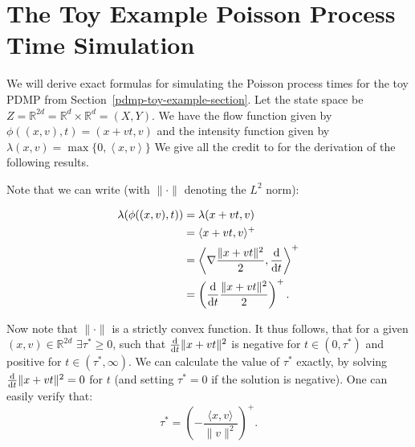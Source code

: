 \documentclass[report.tex]{subfiles}
\begin{document}
\chapter{The Toy Example Poisson Process Time Simulation}
\label{appendix-toy-example-poisson-process-jump-time-simulation}

We will derive exact formulas for simulating the Poisson process times
for the toy PDMP from Section~\ref{pdmp-toy-example-section}.
Let the state space be
$Z = \mathbb{R}^{2d} = \mathbb{R}^{d} \times \mathbb{R}^{d} = (X, Y)$.
We have the flow function given by $\phi((x,v), t) = (x + vt, v)$ and the
intensity function given by $\lambda(x, v) = \max\{0, \left\langle x, v \right\rangle\}$
We give all the credit to \citet{bouchard2015bouncy} for the derivation
of the following results.

Note that we can write (with $\lVert \cdot \rVert$ denoting the $L^{2}$ norm):

\begin{align*}
  \lambda(\phi((x, v), t))
  &= \lambda(x + vt, v) \\
  &= \langle x + vt, v \rangle^{+} \\
  &= \left\langle \nabla \frac{\lVert x + vt \rVert^{2}}{2}, \dv{}{t} (x + vt) \right\rangle^{+} \\
  &= \left( \dv{}{t} \frac{\lVert x + vt \rVert^{2}}{2} \right)^{+}.
\end{align*}

Now note that $\lVert \cdot \rVert$ is a strictly convex function. It thus follows, that
for a given $(x, v) \in \mathbb{R}^{2d}\,\, \exists \tau^{*} \geq 0$, such that
$\dv{}{t} \lVert x + vt \rVert^{2}$ is negative for $t \in (0, \tau^{*})$ and positive
for $t \in (\tau^{*}, \infty)$. We can calculate the value of $\tau^{*}$ exactly,
by solving $\dv{}{t} \lVert x + vt \rVert^{2} = 0$ for $t$ (and setting $\tau^{*} = 0$ if the solution is negative).
One can easily verify that:
\begin{equation}
  \label{tau-star-equation}
  \tau^{*} = \left( -\frac{\langle x, v \rangle}{\lVert v \rVert^{2}} \right)^{+}.
\end{equation}
\end{document}
